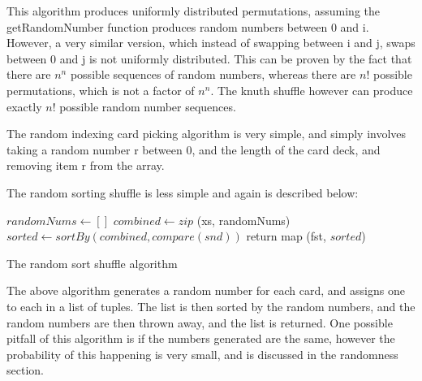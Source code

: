 \vspace{0.3cm}

This algorithm produces uniformly distributed permutations, assuming the
getRandomNumber function produces random numbers between 0 and i. However,
a very similar version, which instead of swapping between i and j, swaps
between 0 and j is not uniformly distributed. This can be proven by
the fact that there are $n^n$ possible sequences of random numbers, whereas
there are ${n!}$ possible permutations, which is not a factor of $n^n$.
The knuth shuffle however can produce exactly ${n!}$ possible random number
sequences. \parencite{website:rici2015}

The random indexing card picking algorithm is very simple, and simply involves
taking a random number r between 0, and the length of the card deck, and
removing item r from the array.

The random sorting shuffle is less simple and again is described below:

\vspace{0.3cm}

\begin{algorithm}[H]
    \BlankLine{}
    $randomNums \leftarrow []$\;
    $combined \leftarrow zip$ (xs, randomNums)\;
    $sorted \leftarrow sortBy ( combined, compare (snd))$\;
    return map (fst, $sorted$)\;
\caption{The random sort shuffle algorithm}
\end{algorithm}

\vspace{0.3cm}

The above algorithm generates a random number for each card, and assigns
one to each in a list of tuples. The list is then sorted by the random numbers,
and the random numbers are then thrown away, and the list is returned. One
possible pitfall of this algorithm is if the numbers generated are the same,
however the probability of this happening is very small, and is discussed
in the randomness section.

